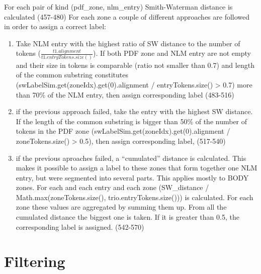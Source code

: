 For each pair of kind (pdf\_zone, nlm\_entry) Smith-Waterman distance
is calculated (457-480) For each zone a couple of different approaches are followed in order to assign a correct label:
\begin{enumerate}
\item Take NLM entry with the highest ratio of SW distance to the number of tokens ($\frac{t1.alignment}{t1.entryTokens.size()}$). If both PDF zone and NLM entry are not empty and their size in tokens is comparable (ratio not smaller than 0.7) and length of the common substring constitutes (swLabelSim.get(zoneIdx).get(0).alignment / entryTokens.size() > 0.7) more than 70\% of the NLM entry, then assign corresponding label (483-516)
\item if the previous approach failed, take the entry with the highest SW distance. If the length of the common substring is bigger than 50\% of the number of tokens in the PDF zone (swLabelSim.get(zoneIdx).get(0).alignment / zoneTokens.size() > 0.5), then assign corresponding label, (517-540)
\item if the previous aproaches failed, a ``cumulated'' distance is calculated. This makes it possible to assign a label to these zones that form together one NLM entry, but were segmented into several parts. This applies mostly to BODY zones. For each and each entry and each zone (SW\_distance / Math.max(zoneTokens.size(), trio.entryTokens.size())) is calculated. For each zone these values are aggregated by summing them up. From all the cumulated distance the biggest one is taken. If it is greater than 0.5, the corresponding label is assigned. (542-570)
\end{enumerate}
\section{Filtering}